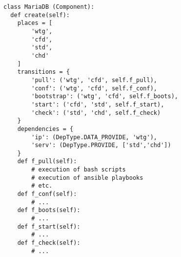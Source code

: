 \begin{lstlisting}[label=codemdb,caption=Madeus code of the MariaDB
  component type.]
class MariaDB (Component):
  def create(self):
    places = [
        'wtg',
        'cfd',
        'std',
        'chd'
    ]
    transitions = {
        'pull': ('wtg', 'cfd', self.f_pull),
        'conf': ('wtg', 'cfd', self.f_conf),
        'bootstrap': ('wtg', 'cfd', self.f_boots),
        'start': ('cfd', 'std', self.f_start),
        'check': ('std', 'chd', self.f_check)
    }
    dependencies = {
        'ip': (DepType.DATA_PROVIDE, 'wtg'),
        'serv': (DepType.PROVIDE, ['std','chd'])
    }
    def f_pull(self):
        # execution of bash scripts
        # execution of ansible playbooks
        # etc.
    def f_conf(self):
        # ...
    def f_boots(self):
        # ...
    def f_start(self):
        # ...
    def f_check(self):
        # ...
\end{lstlisting}
